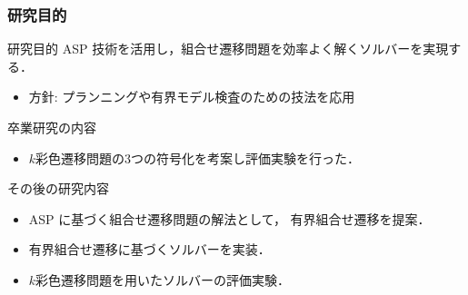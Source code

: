 \documentclass[dvipdfmx,11pt]{beamer}
\begin{document}
\begin{frame}
  \frametitle{研究目的}
  \begin{alertblock}{研究目的}
    ASP 技術を活用し，組合せ遷移問題を効率よく解くソルバーを実現する．
  \end{alertblock}
  \begin{itemize}
  \item 方針: プランニングや有界モデル検査のための技法を応用
  \end{itemize}

  \begin{block}{卒業研究の内容}
    \begin{itemize}
      \item $k$彩色遷移問題の3つの符号化を考案し評価実験を行った．
    \end{itemize}
  \end{block}

  \begin{block}{その後の研究内容}
    \begin{itemize}
      \item ASP に基づく組合せ遷移問題の解法として，
        \alert{有界組合せ遷移}を提案．
      \item 有界組合せ遷移に基づくソルバーを実装．
      \item $k$彩色遷移問題を用いたソルバーの評価実験．
    \end{itemize}
  \end{block}
\end{frame}
\end{document}
